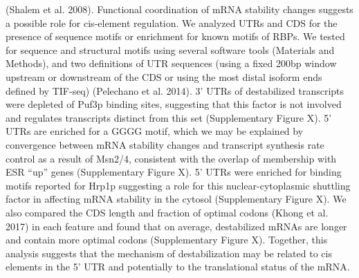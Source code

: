 (Shalem et al. 2008).  Functional coordination of mRNA stability
changes suggests  a possible role for cis-element regulation. We
analyzed UTRs and CDS for the presence of  sequence motifs or
enrichment for known motifs of RBPs. We tested for sequence and
structural motifs using several software tools (Materials and
Methods), and two definitions of UTR sequences (using a fixed 200bp
window upstream or downstream of the CDS or using the most distal
isoform ends defined by TIF-seq) (Pelechano et al. 2014). 3’ UTRs of
destabilized transcripts were depleted of Puf3p binding sites,
suggesting that this factor is not involved and regulates transcripts
distinct from this set (Supplementary Figure X). 5’ UTRs are enriched
for a GGGG motif, which we may be explained by convergence between
mRNA stability changes and transcript synthesis rate control as a
result of  Msn2/4, consistent with the overlap of membership with ESR
“up” genes (Supplementary Figure X). 5’ UTRs were enriched for
binding motifs reported for Hrp1p suggesting a role for this
nuclear-cytoplasmic shuttling  factor in affecting mRNA stability in
the cytosol (Supplementary Figure X). We also compared the CDS length
and fraction of optimal codons (Khong et al. 2017) in each feature and
found that on average, destabilized mRNAs are longer and contain more
optimal codons (Supplementary Figure X). Together, this analysis
suggests that the mechanism of destabilization may be related to cis
elements in the 5’ UTR and potentially to the translational status of
the mRNA.
  

